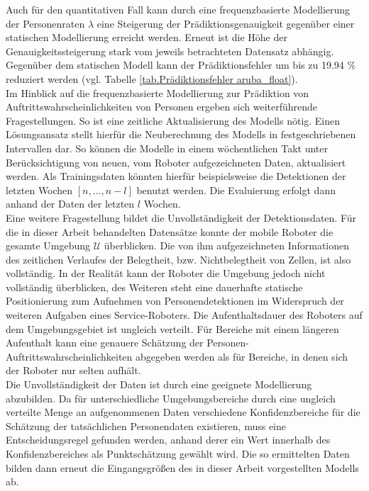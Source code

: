 Auch für den quantitativen Fall kann durch eine frequenzbasierte Modellierung der Personenraten $\lambda$ eine Steigerung der Prädiktionsgenauigkeit gegenüber einer statischen Modellierung erreicht werden. Erneut ist die Höhe der Genauigkeitssteigerung stark vom jeweils betrachteten Datensatz abhängig. Gegenüber dem statischen Modell kann der Prädiktionsfehler um bis zu 19.94 \% reduziert werden (vgl. Tabelle \ref{tab.Prädiktionsfehler aruba_float}). \\
Im Hinblick auf die frequenzbasierte Modellierung zur Prädiktion von Auftrittswahrscheinlichkeiten von Personen ergeben sich weiterführende Fragestellungen.
So ist eine zeitliche Aktualisierung des Modells nötig. Einen Lösungsansatz stellt hierfür die Neuberechnung des Modells in festgeschriebenen Intervallen dar. So können die Modelle in einem wöchentlichen Takt unter Berücksichtigung von neuen, vom Roboter aufgezeichneten Daten, aktualisiert werden. Als Trainingsdaten könnten hierfür beispielsweise die Detektionen der letzten Wochen $[n, \dots, n -l]$ benutzt werden. Die Evaluierung erfolgt dann anhand der Daten der letzten $l$ Wochen. \\
Eine weitere Fragestellung bildet die Unvollständigkeit der Detektionsdaten. Für die in dieser Arbeit behandelten Datensätze konnte der mobile Roboter die gesamte Umgebung $\mathcal{U}$ überblicken. Die von ihm aufgezeichneten Informationen des zeitlichen Verlaufes der Belegtheit, bzw. Nichtbelegtheit von Zellen, ist also vollständig. In der Realität kann der Roboter die Umgebung jedoch nicht vollständig überblicken, des Weiteren steht eine dauerhafte statische Positionierung zum Aufnehmen von Personendetektionen im Widerspruch der weiteren Aufgaben eines Service-Roboters. Die Aufenthaltsdauer des Roboters auf dem Umgebungsgebiet ist ungleich verteilt. Für Bereiche mit einem längeren Aufenthalt kann eine genauere Schätzung der Personen-Auftrittswahrscheinlichkeiten abgegeben werden als für Bereiche, in denen sich der Roboter nur selten aufhält. \\
Die Unvollständigkeit der Daten ist durch eine geeignete Modellierung abzubilden. Da für unterschiedliche Umgebungsbereiche durch eine ungleich verteilte Menge an aufgenommenen Daten verschiedene Konfidenzbereiche für die Schätzung der tatsächlichen Personendaten existieren, muss eine Entscheidungsregel gefunden werden, anhand derer ein Wert innerhalb des Konfidenzbereiches als Punktschätzung gewählt wird. Die so ermittelten Daten bilden dann erneut die Eingangsgrößen des in dieser Arbeit vorgestellten Modells ab. 